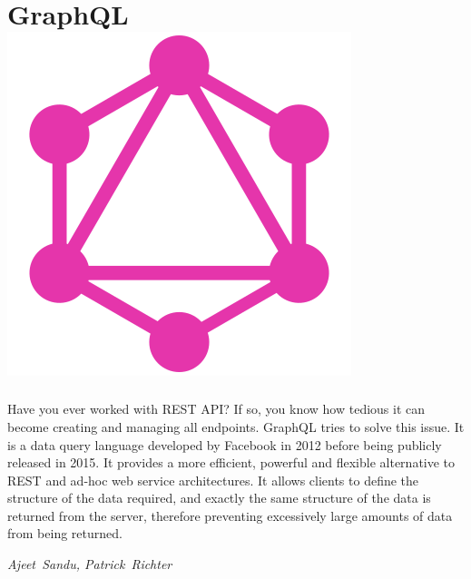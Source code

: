 \section*{GraphQL\hfill\includegraphics[width=.35\linewidth]{images/GraphQLLogo.png}}

Have you ever worked with REST API? If so, you know how tedious it can become 
creating and managing all endpoints. GraphQL tries to solve this issue. It is a data query 
language developed by Facebook in 2012 before
being publicly released in 2015.
It provides a more efficient, powerful and flexible
alternative to REST and ad-hoc web service architectures.
It allows clients to define the structure of the data required, and exactly the same structure of the data is returned from the server, therefore preventing excessively large amounts of data from being returned.

\hfill\textit{Ajeet~Sandu, Patrick~Richter}


